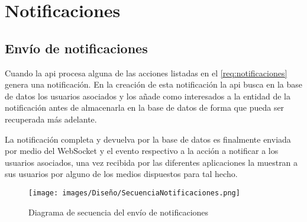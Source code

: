 \section{Notificaciones}

\subsection{Envío de notificaciones}

Cuando la \acrshort{api} procesa alguna de las acciones listadas en el \cref{req:notificaciones} genera una notificación. En la creación de esta notificación la \acrshort{api} busca en la base de datos los usuarios asociados y los añade como interesados a la entidad de la notificación antes de almacenarla en la base de datos de forma que pueda ser recuperada más adelante.

La notificación completa y devuelva por la base de datos es finalmente enviada por medio del WebSocket y el evento respectivo a la acción a notificar a los usuarios asociados, una vez recibida por las diferentes aplicaciones la muestran a sus usuarios por alguno de los medios dispuestos para tal hecho.

\begin{figure}[H]
    \centering
    \texttt{[image: images/Diseño/SecuenciaNotificaciones.png]}
    \caption{Diagrama de secuencia del envío de notificaciones}
    \label{dia:secuencia_notificacion}
\end{figure}